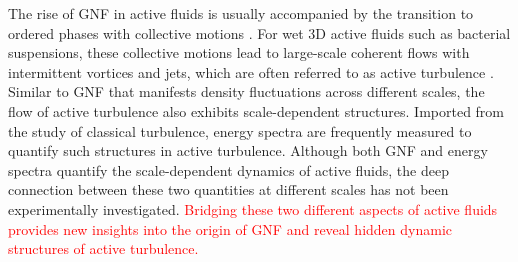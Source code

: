 \documentclass[twocolumn,aps,prl,amsmath,amssymb,longbibliography]{revtex4-2}
\begin{document}



The rise of GNF in active fluids is usually accompanied by the transition to ordered phases with collective motions \cite{Ramaswamy2010,Marchetti2013}. For wet 3D active fluids such as bacterial suspensions, these collective motions lead to large-scale coherent flows with intermittent vortices and jets, which are often referred to as active turbulence \cite{Wolgemuth2008,Wensink2012,Dunkel2013a,Bratanov2015,Guo2018,Linkmann2019,Bardfalvy2019,Alert2020,Skultety2020,Peng2020}. Similar to GNF that manifests density fluctuations across different scales, the flow of active turbulence also exhibits scale-dependent structures. Imported from the study of classical turbulence, energy spectra are frequently measured to quantify such structures in active turbulence. Although both GNF and energy spectra quantify the scale-dependent dynamics of active fluids, the deep connection between these two quantities at different scales has not been experimentally investigated. \textcolor{red}{Bridging these two different aspects of active fluids provides new insights into the origin of GNF and reveal hidden dynamic structures of active turbulence.}

\end{document}
